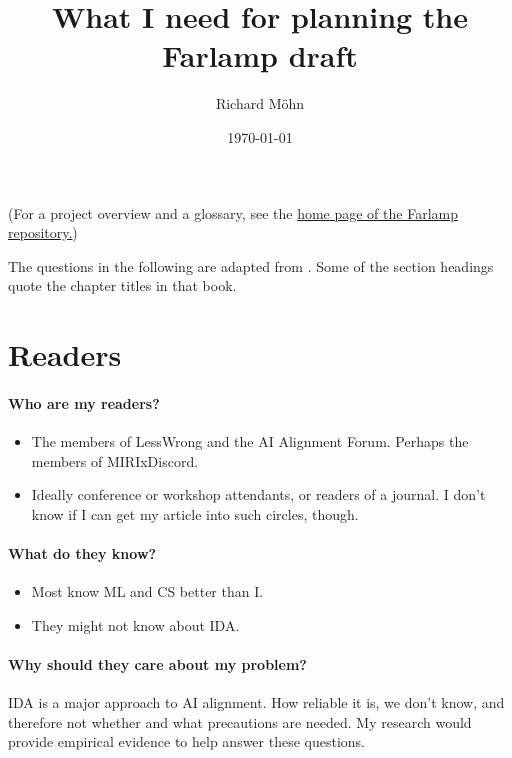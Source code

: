 \documentclass{farlamp}
\title{What I need for planning the Farlamp draft}
\author{Richard Möhn}
\date{\today}
\begin{document}
\maketitle
\RaggedRight

(For a project overview and a glossary, see the
\href{https://github.com/rmoehn/farlamp}{home page of the Farlamp
repository.})

The questions in the following are adapted from \textcite[p. 175]{CoR}. Some of
the section headings quote the chapter titles in that book.

\section{Readers}

\paragraph{Who are my readers?}

\begin{itemize}
\item The members of LessWrong and the AI Alignment Forum. Perhaps the members
    of MIRIxDiscord.
\item Ideally conference or workshop attendants, or readers of a journal. I
    don't know if I can get my article into such circles, though.
\end{itemize}

\paragraph{What do they know?}

\begin{itemize}
\item Most know ML and CS better than I.
\item They might not know about IDA.
\end{itemize}

\paragraph{Why should they care about my problem?}

IDA is a major approach to AI alignment. How reliable it is, we don't know, and
therefore not whether and what precautions are needed. My research would provide
empirical evidence to help answer these questions.
\end{document}

